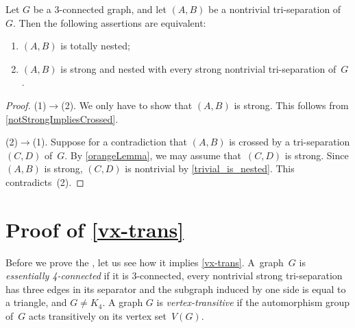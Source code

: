 \documentclass{aic}
\theoremstyle{plain}
\theoremstyle{definition}
\theoremstyle{plain}
\theoremstyle{plain}
\begin{document}
\begin{prop}\label{expendable}
Let $G$ be a 3-connected graph, and let $(A,B)$ be a nontrivial tri-separation of~$G$.
Then the following assertions are equivalent:
\begin{enumerate}
    \item $(A,B)$ is totally nested;
    \item $(A,B)$ is strong and nested with every strong nontrivial tri-separation of~$G$.
\end{enumerate}
\end{prop}
\begin{proof}
(1)$\to$(2).
We only have to show that $(A,B)$ is strong.
This follows from \autoref{notStrongImpliesCrossed}.

(2)$\to$(1).
Suppose for a contradiction that $(A,B)$ is crossed by a tri-separation $(C,D)$ of~$G$.
By \autoref{orangeLemma}, we may assume that~$(C,D)$ is strong.
Since $(A,B)$ is strong, $(C,D)$ is nontrivial by \autoref{trivial_is_nested}.
This contradicts~(2).
\end{proof}



\section[Proof of Corollary 2]{Proof of \autoref{vx-trans}}\label{sec:Cor2}%

Before we prove the , let us see how it implies \autoref{vx-trans}.
A~graph~$G$ is \emph{essentially 4-connected} if it is 3-connected, every nontrivial strong tri-separation has three edges in its separator and the subgraph induced by one side is equal to a triangle, and $G\neq K_4$.
A graph $G$ is \emph{vertex-transitive} if the automorphism group of~$G$ acts transitively on its vertex set~$V(G)$.
\end{document}
